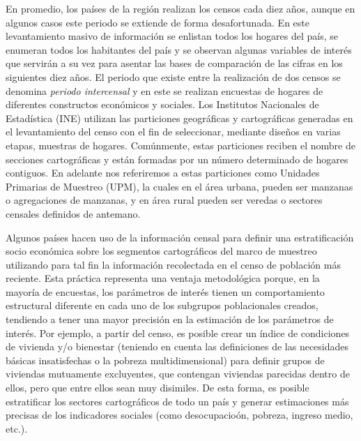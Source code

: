\documentclass[
  10pt,
  spanish,
]{book}
\begin{document}
En promedio, los países de la región realizan los censos cada diez años, aunque en algunos casos este periodo se extiende de forma desafortunada. En este levantamiento masivo de información se enlistan todos los hogares del país, se enumeran todos los habitantes del país y se observan algunas variables de interés que servirán a su vez para asentar las bases de comparación de las cifras en los siguientes diez años. El periodo que existe entre la realización de dos censos se denomina \emph{periodo intercensal} y en este se realizan encuestas de hogares de diferentes constructos económicos y sociales. Los Institutos Nacionales de Estadística (INE) utilizan las particiones geográficas y cartográficas generadas en el levantamiento del censo con el fin de seleccionar, mediante diseños en varias etapas, muestras de hogares. Comúnmente, estas particiones reciben el nombre de secciones cartográficas y están formadas por un número determinado de hogares contiguos. En adelante nos referiremos a estas particiones como Unidades Primarias de Muestreo (UPM), la cuales en el área urbana, pueden ser manzanas o agregaciones de manzanas, y en área rural pueden ser veredas o sectores censales definidos de antemano.

Algunos países hacen uso de la información censal para definir una estratificación socio económica sobre los segmentos cartográficos del marco de muestreo utilizando para tal fin la información recolectada en el censo de población más reciente. Esta práctica representa una ventaja metodológica porque, en la mayoría de encuestas, los parámetros de interés tienen un comportamiento estructural diferente en cada uno de los subgrupos poblacionales creados, tendiendo a tener una mayor precisión en la estimación de los parámetros de interés. Por ejemplo, a partir del censo, es posible crear un índice de condiciones de vivienda y/o bienestar (teniendo en cuenta las definiciones de las necesidades básicas insatisfechas o la pobreza multidimensional) para definir grupos de viviendas mutuamente excluyentes, que contengan viviendas parecidas dentro de ellos, pero que entre ellos sean muy disimiles. De esta forma, es posible estratificar los sectores cartográficos de todo un país y generar estimaciones más precisas de los indicadores sociales (como desocupacioón, pobreza, ingreso medio, etc.).
\end{document}
